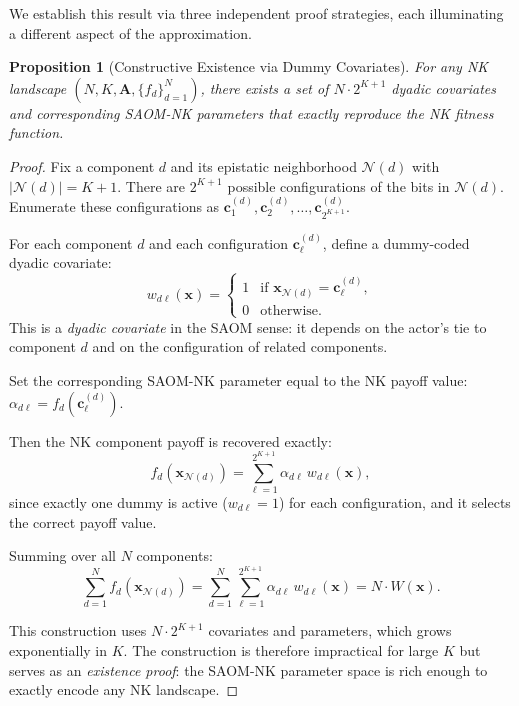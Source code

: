 \documentclass[12pt]{article}
\newtheorem{proposition}{Proposition}
\newcommand{\bx}{\mathbf{x}}
\newcommand{\bA}{\mathbf{A}}
\begin{document}
We establish this result via three independent proof strategies, each
illuminating a different aspect of the approximation.

\begin{proposition}[Constructive Existence via Dummy Covariates]
\label{prop:constructive}
For any NK landscape $(N, K, \bA, \{f_d\}_{d=1}^N)$, there exists a set of
$N \cdot 2^{K+1}$ dyadic covariates and corresponding SAOM-NK parameters that
\emph{exactly} reproduce the NK fitness function.
\end{proposition}

\begin{proof}
Fix a component $d$ and its epistatic neighborhood $\mathcal{N}(d)$ with
$|\mathcal{N}(d)| = K + 1$. There are $2^{K+1}$ possible configurations of
the bits in $\mathcal{N}(d)$. Enumerate these configurations as
$\mathbf{c}_1^{(d)}, \mathbf{c}_2^{(d)}, \ldots, \mathbf{c}_{2^{K+1}}^{(d)}$.

For each component $d$ and each configuration $\mathbf{c}_\ell^{(d)}$, define
a dummy-coded dyadic covariate:
\begin{equation}
\label{eq:dummy_covariate}
  w_{d\ell}(\bx) =
  \begin{cases}
    1 & \text{if } \bx_{\mathcal{N}(d)} = \mathbf{c}_\ell^{(d)}, \\
    0 & \text{otherwise}.
  \end{cases}
\end{equation}
This is a \emph{dyadic covariate} in the SAOM sense: it depends on the
actor's tie to component $d$ and on the configuration of related
components.

Set the corresponding SAOM-NK parameter equal to the NK payoff value:
$\alpha_{d\ell} = f_d(\mathbf{c}_\ell^{(d)})$.

Then the NK component payoff is recovered exactly:
\begin{equation*}
  f_d(\bx_{\mathcal{N}(d)}) = \sum_{\ell=1}^{2^{K+1}} \alpha_{d\ell} \, w_{d\ell}(\bx),
\end{equation*}
since exactly one dummy is active ($w_{d\ell} = 1$) for each configuration,
and it selects the correct payoff value.

Summing over all $N$ components:
\begin{equation*}
  \sum_{d=1}^{N} f_d(\bx_{\mathcal{N}(d)})
  = \sum_{d=1}^{N} \sum_{\ell=1}^{2^{K+1}} \alpha_{d\ell} \, w_{d\ell}(\bx)
  = N \cdot W(\bx).
\end{equation*}

This construction uses $N \cdot 2^{K+1}$ covariates and parameters, which
grows exponentially in $K$. The construction is therefore impractical for
large $K$ but serves as an \emph{existence proof}: the SAOM-NK parameter
space is rich enough to exactly encode any NK landscape.
\end{proof}
\end{document}

